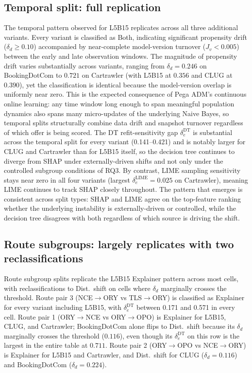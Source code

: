 \documentclass[oneside]{memoir} %
\begin{document}
\subsection{Temporal split: full replication}

The temporal pattern observed for L5B15 replicates across all three additional variants. Every variant is classified as Both, indicating significant propensity drift ($\delta_d \geq 0.10$) accompanied by near-complete model-version turnover ($J_v < 0.005$) between the early and late observation windows. The magnitude of propensity drift varies substantially across variants, ranging from $\delta_d = 0.246$ on BookingDotCom to $0.721$ on Cartrawler (with L5B15 at $0.356$ and CLUG at $0.390$), yet the classification is identical because the model-version overlap is uniformly near zero. This is the expected consequence of Pega ADM's continuous online learning: any time window long enough to span meaningful population dynamics also spans many micro-updates of the underlying Naive Bayes, so temporal splits structurally combine data drift and snapshot turnover regardless of which offer is being scored. The DT refit-sensitivity gap $\delta_e^{\mathrm{DT}}$ is substantial across the temporal split for every variant (0.141--0.421) and is notably larger for CLUG and Cartrawler than for L5B15 itself, so the decision tree continues to diverge from SHAP under externally-driven shifts and not only under the controlled subgroup conditions of RQ3. By contrast, LIME sampling sensitivity stays near zero in all four variants (largest $\delta_e^{\mathrm{LIME}} = 0.025$ on Cartrawler), meaning LIME continues to track SHAP closely throughout. The pattern that emerges is consistent across split types: SHAP and LIME agree on the top-feature ranking whether the underlying instability is externally-driven or controlled, while the decision tree disagrees with both regardless of which source is driving the shift.

\subsection{Route subgroups: largely replicates with two reclassifications}

Route subgroup splits replicate the L5B15 Explainer pattern across most cells, with reclassifications to Dist.\ shift on cells where $\delta_d$ marginally crosses the threshold. Route pair 3 (NCE$\to$ORY vs TLS$\to$ORY) is classified as Explainer for every variant including L5B15, with $\delta_e^{\mathrm{DT}}$ between 0.171 and 0.571 in every cell. Route pair 1 (ORY$\to$NCE vs ORY$\to$OPO) is Explainer for L5B15, CLUG, and Cartrawler; BookingDotCom alone flips to Dist.\ shift because its $\delta_d$ marginally crosses the threshold ($0.116$), even though its $\delta_e^{\mathrm{DT}}$ on this row is the largest in the entire table at $0.711$. Route pair 2 (ORY$\to$OPO vs NCE$\to$ORY) is Explainer for L5B15 and Cartrawler, and Dist.\ shift for CLUG ($\delta_d = 0.116$) and BookingDotCom ($\delta_d = 0.224$).
\end{document}
